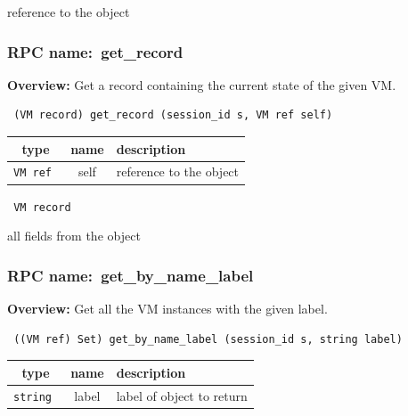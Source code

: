 reference to the object
\vspace{0.3cm}
\vspace{0.3cm}
\vspace{0.3cm}
\subsubsection{RPC name:~get\_record}

{\bf Overview:} 
Get a record containing the current state of the given VM.

\begin{verbatim} (VM record) get_record (session_id s, VM ref self)\end{verbatim}



 
\vspace{0.3cm}
\begin{tabular}{|c|c|p{7cm}|}
 \hline
{\bf type} & {\bf name} & {\bf description} \\ \hline
{\tt VM ref } & self & reference to the object \\ \hline 

\end{tabular}

\vspace{0.3cm}

{\tt 
VM record
}


all fields from the object
\vspace{0.3cm}
\vspace{0.3cm}
\vspace{0.3cm}
\subsubsection{RPC name:~get\_by\_name\_label}

{\bf Overview:} 
Get all the VM instances with the given label.

\begin{verbatim} ((VM ref) Set) get_by_name_label (session_id s, string label)\end{verbatim}



 
\vspace{0.3cm}
\begin{tabular}{|c|c|p{7cm}|}
 \hline
{\bf type} & {\bf name} & {\bf description} \\ \hline
{\tt string } & label & label of object to return \\ \hline 

\end{tabular}

